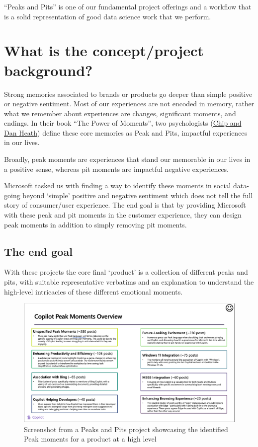 \documentclass[
  letterpaper,
  DIV=11,
  numbers=noendperiod]{scrreprt}
\begin{document}
``Peaks and Pits'' is one of our fundamental project offerings and a
workflow that is a solid representation of good data science work that
we perform.

\section{What is the concept/project
background?}\label{what-is-the-conceptproject-background}

Strong memories associated to brands or products go deeper than simple
positive or negative sentiment. Most of our experiences are not encoded
in memory, rather what we remember about experiences are changes,
significant moments, and endings. In their book ``The Power of
Moments'', two psychologists
(\href{https://heathbrothers.com/about/}{Chip and Dan Heath}) define
these core memories as Peak and Pits, impactful experiences in our
lives.

Broadly, peak moments are experiences that stand our memorable in our
lives in a positive sense, whereas pit moments are impactful negative
experiences.

Microsoft tasked us with finding a way to identify these moments in
social data- going beyond `simple' positive and negative sentiment which
does not tell the full story of consumer/user experience. The end goal
is that by providing Microsoft with these peak and pit moments in the
customer experience, they can design peak moments in addition to simply
removing pit moments.

\subsection{The end goal}\label{the-end-goal}

With these projects the core final `product' is a collection of
different peaks and pits, with suitable representative verbatims and an
explanation to understand the high-level intricacies of these different
emotional moments.

\begin{figure}[H]

{\centering \includegraphics{img/peaks_list.png}

}

\caption{Screenshot from a Peaks and Pits project showcasing the
identified Peak moments for a product at a high level}

\end{figure}%
\end{document}
